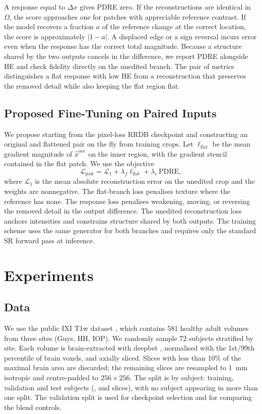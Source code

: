 \documentclass[journal]{IEEEtran}
\begin{document}
A response equal to $\Delta x$ gives PDRE zero. If the reconstructions are identical in $\Omega$, the score approaches one for patches with appreciable reference contrast. If the model recovers a fraction $a$ of the reference change at the correct location, the score is approximately $|1-a|$. A displaced edge or a sign reversal incurs error even when the response has the correct total magnitude. Because a structure shared by the two outputs cancels in the difference, we report PDRE alongside HE and check fidelity directly on the unedited branch. The pair of metrics distinguishes a flat response with low HE from a reconstruction that preserves the removed detail while also keeping the flat region flat.

\subsection{Proposed Fine-Tuning on Paired Inputs}
\label{sec:pair-training}
We propose starting from the pixel-loss RRDB checkpoint and constructing an original and flattened pair on the fly from training crops. Let $\ell_{\mathrm{flat}}$ be the mean gradient magnitude of $\hat{x}^{\mathrm{occ}}$ on the inner region, with the gradient stencil contained in the flat patch. We use the objective
\begin{equation}
\mathcal{L}_{\mathrm{pair}} =
\mathcal{L}_{1} + \lambda_f\ell_{\mathrm{flat}}
+ \lambda_r\,\mathrm{PDRE},
\label{eq:pair-loss}
\end{equation}
where $\mathcal{L}_{1}$ is the mean absolute reconstruction error on the unedited crop and the weights are nonnegative. The flat-branch loss penalises texture where the reference has none. The response loss penalises weakening, moving, or reversing the removed detail in the output difference. The unedited reconstruction loss anchors intensities and constrains structure shared by both outputs. The training scheme uses the same generator for both branches and requires only the standard SR forward pass at inference.

\section{Experiments}
\subsection{Data}
We use the public IXI T1w dataset \cite{ixi2007}, which contains 581 healthy adult volumes from three sites (Guys, HH, IOP). We randomly sample 72 subjects stratified by site. Each volume is brain-extracted with deepbet \cite{deepbet2024}, normalised with the 1st/99th percentile of brain voxels, and axially sliced. Slices with less than 10\% of the maximal brain area are discarded; the remaining slices are resampled to 1~mm isotropic and centre-padded to $256\times256$. The split is by subject: \numTrainSubjects{} training, \numValSubjects{} validation and \numTestSubjects{} test subjects (\numTrainSlices{}, \numValSlices{} and \numTestSlices{} slices), with no subject appearing in more than one split. The validation split is used for checkpoint selection and for comparing the blend controls.
\end{document}

